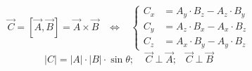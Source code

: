 \begin{itemize}
 \begin{displaymath}
 \vec{C} = \left[\vec{A},\vec{B}\right] = \vec{A}\times\vec{B}\;\;\;\Leftrightarrow\;\;\;
 \left\{\begin{array}{cc}C_x &= A_y\cdot B_z - A_z\cdot B_y\\
                         C_y &= A_z\cdot B_x - A_x\cdot B_z\\
                         C_z &= A_x\cdot B_y - A_y\cdot B_z\end{array}\right.
 \end{displaymath}
 \begin{displaymath}
  |C|=|A|\cdot|B|\cdot\sin\theta;\;\;\;\; \vec{C}\perp\vec{A};\;\;\;\vec{C}\perp\vec{B}
\end{displaymath}
\end{itemize}

